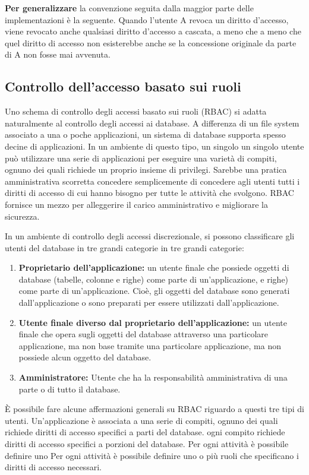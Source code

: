 \begin{center}
    \textbf{Per generalizzare} la convenzione seguita dalla maggior parte delle implementazioni è la seguente. Quando l'utente A revoca un diritto d'accesso, viene revocato anche qualsiasi diritto d'accesso a cascata, a meno che a meno che quel diritto di accesso non esisterebbe anche se la concessione originale da parte di A non fosse mai avvenuta.
\end{center}
\subsection{Controllo dell'accesso basato sui ruoli}
Uno schema di controllo degli accessi basato sui ruoli (RBAC) si adatta naturalmente al controllo degli accessi ai database. A differenza di un file system associato a una o poche applicazioni, un sistema di database supporta spesso decine di applicazioni. In un ambiente di questo tipo, un singolo un singolo utente può utilizzare una serie di applicazioni per eseguire una varietà di compiti, ognuno dei quali richiede un proprio insieme di privilegi. Sarebbe una pratica amministrativa scorretta concedere semplicemente di concedere agli utenti tutti i diritti di accesso di cui hanno bisogno per tutte le attività che svolgono. RBAC fornisce un mezzo per alleggerire il carico amministrativo e migliorare la sicurezza.

\singlespacing

In un ambiente di controllo degli accessi discrezionale, si possono classificare gli utenti del database in tre grandi categorie in tre grandi categorie:

\begin{enumerate}
    \item \textbf{Proprietario dell'applicazione:} un utente finale che possiede oggetti di database (tabelle, colonne e righe) come parte di un'applicazione, e righe) come parte di un'applicazione. Cioè, gli oggetti del database sono generati dall'applicazione o sono preparati per essere utilizzati dall'applicazione.
    
    \item \textbf{Utente finale diverso dal proprietario dell'applicazione:} un utente finale che opera sugli oggetti del database attraverso una particolare applicazione, ma non base tramite una particolare applicazione, ma non possiede alcun oggetto del database.
    
    \item \textbf{Amministratore:} Utente che ha la responsabilità amministrativa di una parte o di tutto il database.
\end{enumerate}
È possibile fare alcune affermazioni generali su RBAC riguardo a questi tre tipi di utenti. Un'applicazione è associata a una serie di compiti, ognuno dei quali richiede diritti di accesso specifici a parti del database. ogni compito richiede diritti di accesso specifici a porzioni del database. Per ogni attività è possibile definire uno Per ogni attività è possibile definire uno o più ruoli che specificano i diritti di accesso necessari. 


